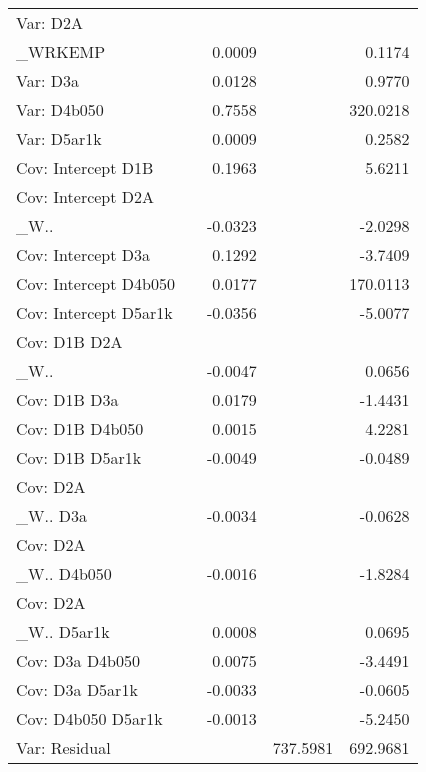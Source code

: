 \documentclass[numbered]{trbunofficial}
\begin{document}
\begin{center}
\begin{longtable}{l D{.}{.}{5.7} D{.}{.}{5.7} D{.}{.}{7.7} D{.}{.}{7.7}}
Var: D2A\\_WRKEMP               &               & 0.0009        &               & 0.1174        \\
Var: D3a                        &               & 0.0128        &               & 0.9770        \\
Var: D4b050                     &               & 0.7558        &               & 320.0218      \\
Var: D5ar1k                     &               & 0.0009        &               & 0.2582        \\
Cov: Intercept D1B              &               & 0.1963        &               & 5.6211        \\
Cov: Intercept D2A\\_W..        &               & -0.0323       &               & -2.0298       \\
Cov: Intercept D3a              &               & 0.1292        &               & -3.7409       \\
Cov: Intercept D4b050           &               & 0.0177        &               & 170.0113      \\
Cov: Intercept D5ar1k           &               & -0.0356       &               & -5.0077       \\
Cov: D1B D2A\\_W..              &               & -0.0047       &               & 0.0656        \\
Cov: D1B D3a                    &               & 0.0179        &               & -1.4431       \\
Cov: D1B D4b050                 &               & 0.0015        &               & 4.2281        \\
Cov: D1B D5ar1k                 &               & -0.0049       &               & -0.0489       \\
Cov: D2A\\_W.. D3a              &               & -0.0034       &               & -0.0628       \\
Cov: D2A\\_W.. D4b050           &               & -0.0016       &               & -1.8284       \\
Cov: D2A\\_W.. D5ar1k           &               & 0.0008        &               & 0.0695        \\
Cov: D3a D4b050                 &               & 0.0075        &               & -3.4491       \\
Cov: D3a D5ar1k                 &               & -0.0033       &               & -0.0605       \\
Cov: D4b050 D5ar1k              &               & -0.0013       &               & -5.2450       \\
Var: Residual                   &               &               & 737.5981      & 692.9681      \\
\end{longtable}
\end{center}
\end{document}
